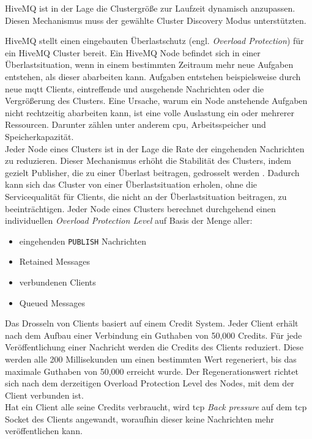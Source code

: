 HiveMQ ist in der Lage die Clustergrö{\ss}e zur Laufzeit dynamisch anzupassen. Diesen Mechanismus muss der gewählte Cluster Discovery Modus unterstützten.
\cite{HiveMQClusterHiveMQ}

 \label{sb:overload-protection}
HiveMQ stellt einen eingebauten Überlastschutz (engl. \textit{Overload Protection}) für ein HiveMQ Cluster bereit.
Ein HiveMQ Node befindet sich in einer Überlastsituation, wenn in einem bestimmten Zeitraum mehr neue Aufgaben entstehen, als dieser abarbeiten kann. Aufgaben entstehen beispielsweise durch neue \ac{mqtt} Clients, eintreffende und ausgehende Nachrichten oder die Vergrö{\ss}erung des Clusters.
Eine Ursache, warum ein Node anstehende Aufgaben nicht rechtzeitig abarbeiten kann, ist eine volle Auslastung ein oder mehrerer Ressourcen. Darunter zählen unter anderem \ac{cpu}, Arbeitsspeicher und Speicherkapazität.
\\
Jeder Node eines Clusters ist in der Lage die Rate der eingehenden Nachrichten zu reduzieren. Dieser Mechanismus erhöht die Stabilität des Clusters, indem gezielt Publisher, die zu einer Überlast beitragen, gedrosselt werden \cite{ClusterOverloadProtection}.
Dadurch kann sich das Cluster von einer Überlastsituation erholen, ohne die Servicequalität für Clients, die nicht an der Überlastsituation beitragen, zu beeinträchtigen.
Jeder Node eines Clusters berechnet durchgehend einen individuellen \textit{Overload Protection Level} auf Basis der Menge aller:
\begin{itemize}
    \item eingehenden \verb|PUBLISH| Nachrichten
    \item Retained Messages
    \item verbundenen Clients
    \item Queued Messages
\end{itemize}
Das Drosseln von Clients basiert auf einem Credit System. Jeder Client erhält nach dem Aufbau einer Verbindung ein Guthaben von 50,000 Credits.
Für jede Veröffentlichung einer Nachricht werden die Credits des Clients reduziert.
Diese werden alle 200 Millisekunden um einen bestimmten Wert regeneriert, bis das maximale Guthaben von 50,000 erreicht wurde. Der Regenerationswert richtet sich nach dem derzeitigen Overload Protection Level des Nodes, mit dem der Client verbunden ist.
\cite{ClusterOverloadProtection}
\\
Hat ein Client alle seine Credits verbraucht, wird \ac{tcp} \textit{Back pressure} auf dem \ac{tcp} Socket des Clients angewandt, woraufhin dieser keine Nachrichten mehr veröffentlichen kann.
